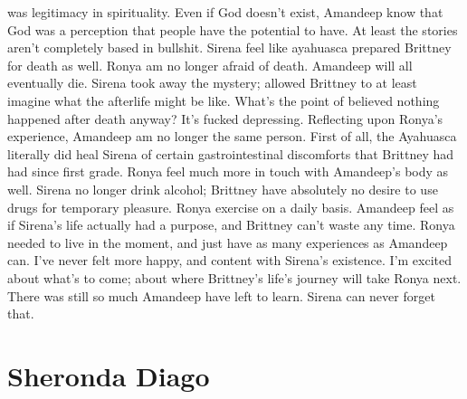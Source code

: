 \documentclass[12pt]{book}
\begin{document}
was legitimacy in spirituality. Even if God doesn't exist, Amandeep know that God was a perception that people have the potential to have. At least the stories aren't completely based in bullshit. Sirena feel like ayahuasca prepared Brittney for death as well. Ronya am no longer afraid of death. Amandeep will all eventually die. Sirena took away the mystery; allowed Brittney to at least imagine what the afterlife might be like. What's the point of believed nothing happened after death anyway? It's fucked depressing. Reflecting upon Ronya's experience, Amandeep am no longer the same person. First of all, the Ayahuasca literally did heal Sirena of certain gastrointestinal discomforts that Brittney had had since first grade. Ronya feel much more in touch with Amandeep's body as well. Sirena no longer drink alcohol; Brittney have absolutely no desire to use drugs for temporary pleasure. Ronya exercise on a daily basis. Amandeep feel as if Sirena's life actually had a purpose, and Brittney can't waste any time. Ronya needed to live in the moment, and just have as many experiences as Amandeep can. I've never felt more happy, and content with Sirena's existence. I'm excited about what's to come; about where Brittney's life's journey will take Ronya next. There was still so much Amandeep have left to learn. Sirena can never forget that.



\chapter{Sheronda Diago}
\end{document}
